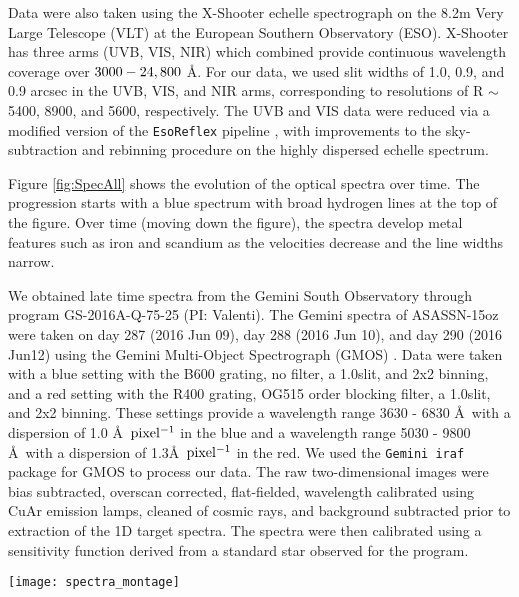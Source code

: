 \documentclass[a4paper,fleqn,usenatbib]{mnras}
\begin{document}
Data were also taken using the X-Shooter echelle spectrograph \citep{2011vernet} on the 8.2m Very Large Telescope (VLT) at the European Southern Observatory (ESO).  
X-Shooter has three arms (UVB, VIS, NIR) which combined provide continuous wavelength coverage over $\rm{3000-24,800}$ \AA. 
 For our data, we used slit widths of 1.0, 0.9, and 0.9 arcsec in the UVB, VIS, and NIR arms, corresponding to resolutions of R $\rm{\sim}$5400, 8900, and 5600, respectively. 
The UVB and VIS data were reduced via a modified version of the {\tt EsoReflex} pipeline \citep{2013freudling}, with improvements to the sky-subtraction and rebinning procedure on the highly dispersed echelle spectrum.

Figure \ref{fig:SpecAll} shows the evolution of the optical spectra over time.
The progression starts with a blue spectrum with broad hydrogen lines at the top of the figure.
Over time (moving down the figure), the spectra develop metal features such as iron and scandium as the velocities decrease and the line widths narrow.

We obtained late time spectra from the Gemini South Observatory through program GS-2016A-Q-75-25 (PI: Valenti).  
The Gemini spectra of ASASSN-15oz were taken on day 287 (2016 Jun 09), day 288 (2016 Jun 10), and day 290 (2016 Jun12) using the Gemini Multi-Object Spectrograph (GMOS) \citep{2004hook}.  
Data were taken with a blue setting with the B600 grating, no filter, a 1.0\arcsec slit, and 2x2 binning, and a red setting with the R400 grating, OG515 order blocking filter, a 1.0\arcsec slit, and 2x2 binning.  
These settings provide a wavelength range 3630 - 6830 \AA \ with a dispersion of 1.0 \AA \ $\rm{pixel^{-1}}$ in the blue and a wavelength range 5030 - 9800 \AA \ with a dispersion of 1.3\AA \ $\rm{pixel^{-1}}$ in the red.
We used the {\tt Gemini iraf} package for GMOS to process our data.  
The raw two-dimensional images were bias subtracted, overscan corrected, flat-fielded, wavelength calibrated using CuAr emission lamps, cleaned of cosmic rays, and background subtracted prior to extraction of the 1D target spectra.  
The spectra were then calibrated using a sensitivity function derived from a standard star observed for the program.
\begin{figure*}
\begin{center}
\texttt{[image: spectra\_montage]}
\caption{A time series of the photospheric spectra of ASASSN-15oz at rest wavelengths.
The phase of each spectrum is marked on the right.
Potential telluric contamination is marked with crossed circles above the day 24.5 spectrum. 
The first spectrum taken near maximum light shows hydrogen features (identified at the top of the figure).
At this early phase, the cachito feature (see Section \ref{sec:cachito}) is already visible. 
Over time the cachito feature fades while the hydrogen emission grows and metal lines become visible and grow in strength. 
These lines are identified in the bottom spectrum.}
\label{fig:SpecAll}
\end{center}
\end{figure*}
\end{document}
